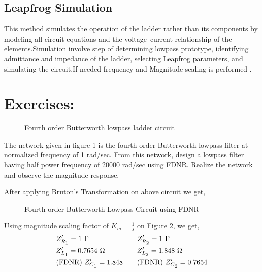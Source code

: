 \documentclass[a4paper,11pt]{article}
\newcommand\ddfrac[2]{\frac{\displaystyle #1}{\displaystyle #2}}
\begin{document}
\subsection{Leapfrog Simulation}
This method simulates the operation of the ladder rather than its components by modeling all circuit equations and the voltage--current relationship of the elements.Simulation involve step of determining lowpass prototype, identifying admittance and impedance of the ladder, selecting Leapfrog parameters, and simulating the circuit.If needed frequency and Magnitude scaling is performed .




\pagebreak
\section{Exercises:}

\begin{figure}[H]
    \centering
    \scalebox{1.25}
    \figquestion
    \caption{Fourth order Butterworth lowpass ladder circuit}
\end{figure}

\begin{Q}
    {
        The network given in figure 1 is the fourth order Butterworth lowpass filter at normalized
        frequency of 1 rad/sec. From this network, design a lowpass filter having half power frequency of
        20000 rad/sec using FDNR. Realize the network and observe the magnitude response.}
\end{Q}
After applying Bruton's Transformation on above circuit we get,

\begin{figure}[H]
    \centering
    \scalebox{1.25}
    \figfdnr
    \caption{Fourth order Butterworth Lowpass Circuit using FDNR}
\end{figure}

Using magnitude scaling factor of $K_m=\ddfrac{1}{s}$ on Figure 2, we get,
\begin{equation*}
    \begin{aligned}
         & Z'_{R\textsubscript{$1$}}=1 \text{ F} \quad           &  & Z'_{R\textsubscript{$2$}}=1 \text{ F}           \\
         & Z'_{L\textsubscript{$1$}}=0.7654 \text{ }\Omega \quad &  & Z'_{L\textsubscript{$2$}}=1.848 \text{ }\Omega  \\
         & \text{(FDNR)  } Z'_{C\textsubscript{$1$}}=1.848 \quad &  & \text{(FDNR)  }Z'_{C\textsubscript{$2$}}=0.7654 \\
    \end{aligned}
\end{equation*}
\end{document}
